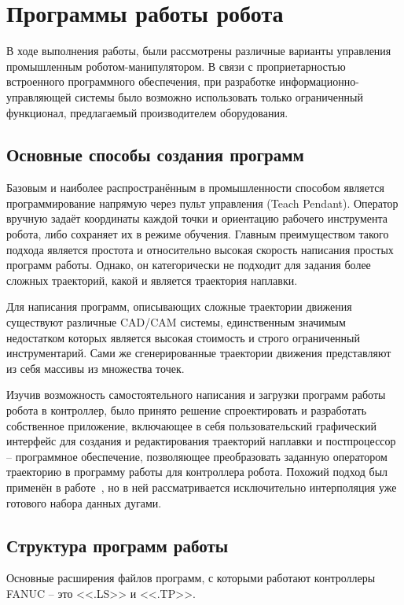 \chapter{Программы работы робота}
В ходе выполнения работы, были рассмотрены различные варианты управления промышленным роботом-манипулятором.
В связи с проприетарностью встроенного программного обеспечения, при разработке информационно-управляющей системы было возможно использовать только ограниченный функционал, предлагаемый производителем оборудования.


\section{Основные способы создания программ}
Базовым и наиболее распространённым в промышленности способом является программирование напрямую через пульт управления (Teach Pendant).
Оператор вручную задаёт координаты каждой точки и ориентацию рабочего инструмента робота, либо сохраняет их в режиме обучения.
Главным преимуществом такого подхода является простота и относительно высокая скорость написания простых программ работы.
Однако, он категорически не подходит для задания более сложных траекторий, какой и является траектория наплавки.

Для написания программ, описывающих сложные траектории движения существуют различные CAD/CAM системы, единственным значимым недостатком которых является высокая стоимость и строго ограниченный инструментарий.
Сами же сгенерированные траектории движения представляют из себя массивы из множества точек.

Изучив возможность самостоятельного написания и загрузки программ работы робота в контроллер, было принято решение спроектировать и разработать собственное приложение, включающее в себя пользовательский графический интерфейс для создания и редактирования траекторий наплавки и постпроцессор -- программное обеспечение, позволяющее преобразовать заданную оператором траекторию в программу работы для контроллера робота.
Похожий подход был применён в работе~\cite{Nagata_2017}, но в ней рассматривается исключительно интерполяция уже готового набора данных дугами.


\section{Структура программ работы} \label{sec:ProgramStructure}
Основные расширения файлов программ, с которыми работают контроллеры FANUC -- это <<.LS>> и <<.TP>>.

